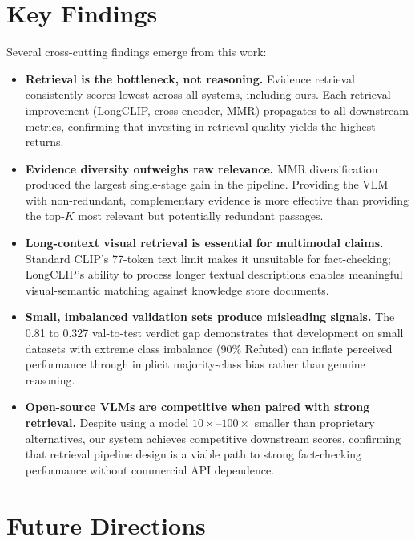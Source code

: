 \section{Key Findings}

Several cross-cutting findings emerge from this work:

\begin{itemize}
    \item \textbf{Retrieval is the bottleneck, not reasoning.} Evidence retrieval consistently scores lowest across all systems, including ours. Each retrieval improvement (LongCLIP, cross-encoder, MMR) propagates to all downstream metrics, confirming that investing in retrieval quality yields the highest returns.
    
    \item \textbf{Evidence diversity outweighs raw relevance.} MMR diversification produced the largest single-stage gain in the pipeline. Providing the VLM with non-redundant, complementary evidence is more effective than providing the top-$K$ most relevant but potentially redundant passages.
    
    \item \textbf{Long-context visual retrieval is essential for multimodal claims.} Standard CLIP's 77-token text limit makes it unsuitable for fact-checking; LongCLIP's ability to process longer textual descriptions enables meaningful visual-semantic matching against knowledge store documents.
    
    \item \textbf{Small, imbalanced validation sets produce misleading signals.} The 0.81 to 0.327 val-to-test verdict gap demonstrates that development on small datasets with extreme class imbalance (90\% Refuted) can inflate perceived performance through implicit majority-class bias rather than genuine reasoning.
    
    \item \textbf{Open-source VLMs are competitive when paired with strong retrieval.} Despite using a model $10\times$--$100\times$ smaller than proprietary alternatives, our system achieves competitive downstream scores, confirming that retrieval pipeline design is a viable path to strong fact-checking performance without commercial API dependence.
\end{itemize}

\section{Future Directions}
\label{sec:conclusions:future}

